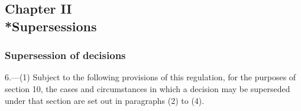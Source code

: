 \documentclass[12pt,a4paper]{article}
\begin{document}
\subsection[Chapter II --- Supersessions]{Chapter II\\*Supersessions}

\subsubsection[6. Supersession of decisions]{Supersession of decisions}

\renewcommand\parthead{--- Part II Chapter II}

6.—(1) Subject to the following provisions of this regulation, for the purposes of section 10, the cases and circumstances in which a decision may be superseded under that section are set out in paragraphs (2) to (4).
\end{document}
